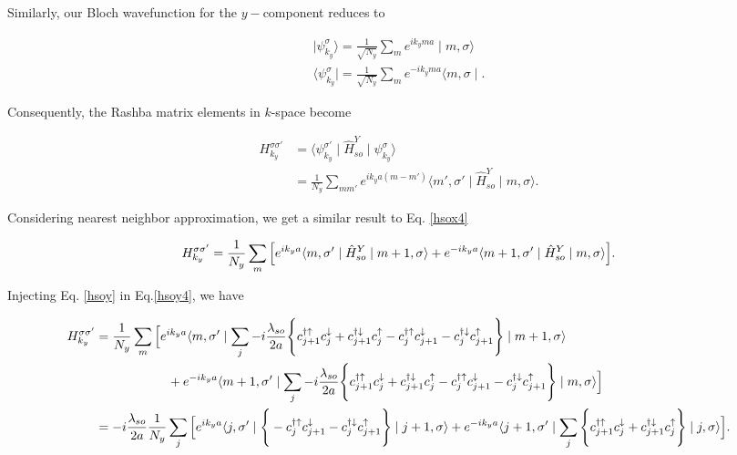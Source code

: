 \documentclass[10pt,prb,showpacs,amssymb,floatfix]{revtex4-1}
\begin{document}
Similarly, our Bloch wavefunction for the $y-$component reduces to

\begin{align}
\mid \psi^\sigma_{k_y} \rangle = \frac{1}{\sqrt{N_y}} \sum_{m} e^{ik_yma} \mid m,\sigma\rangle \\
\langle \psi^\sigma_{k_y} \mid = \frac{1}{\sqrt{N_y}} \sum_{m} e^{-ik_yma} \langle m,\sigma\mid.
\end{align}

Consequently, the Rashba matrix elements in $k$-space become

\begin{align}
H_{k_y}^{\sigma \sigma'} &= \langle \psi^{\sigma'}_{k_y} \mid \hat H^Y_{so} \mid \psi^\sigma_{k_y} \rangle \\
&= \frac{1}{N_y}\sum_{m m'} e^{i k_y a (m-m')} \langle m',\sigma' \mid \hat{H}^Y_{so} \mid m,\sigma\rangle.
\label{hsoy2}
\end{align}

Considering nearest neighbor approximation, we get a similar result to Eq. \eqref{hsox4}

\begin{align}
H_{k_y}^{\sigma \sigma'} = \frac{1}{N_y}\sum_{m} \Big{[} e^{i k_y a} \langle m,\sigma' \mid \hat{H}^Y_{so} \mid m+1,\sigma\rangle + e^{-i k_y a} \langle m+1,\sigma' \mid \hat{H}^Y_{so} \mid m,\sigma\rangle \Big{]}.
\label{hsoy4}
\end{align}


Injecting Eq. \eqref{hsoy} in Eq.\eqref{hsoy4}, we have

\begin{align}
H_{k_y}^{\sigma \sigma'} &= \frac{1}{N_y}\sum_{m} \Big{[} e^{i k_y a} \langle m,\sigma' \mid \sum_{j}  -i\frac{\lambda_{so}}{2a} \Bigg{\{} c_{j+1}^{\dagger \uparrow} c_{j}^\downarrow +  c_{j+1}^{\dagger \downarrow} c_{j}^\uparrow - c_{j}^{\dagger \uparrow} c_{j+1}^\downarrow   - c_{j}^{\dagger \downarrow} c_{j+1}^\uparrow \Bigg{\}} \mid m+1,\sigma\rangle \\
&~~~~~~~~~~~~~~~~~ + e^{-i k_y a} \langle m+1,\sigma' \mid \sum_{j}  -i\frac{\lambda_{so}}{2a} \Bigg{\{} c_{j+1}^{\dagger \uparrow} c_{j}^\downarrow +  c_{j+1}^{\dagger \downarrow} c_{j}^\uparrow - c_{j}^{\dagger \uparrow} c_{j+1}^\downarrow   - c_{j}^{\dagger \downarrow} c_{j+1}^\uparrow \Bigg{\}} \mid m,\sigma\rangle \Big{]} \\
&= -i\frac{\lambda_{so}}{2a} \frac{1}{N_y}\sum_{j} \Big{[} e^{i k_y a} \langle j,\sigma' \mid    \Bigg{\{}  - c_{j}^{\dagger \uparrow} c_{j+1}^\downarrow   - c_{j}^{\dagger \downarrow} c_{j+1}^\uparrow \Bigg{\}} \mid j+1,\sigma\rangle +e^{-i k_y a} \langle j+1,\sigma' \mid \sum_{j} \Bigg{\{} c_{j+1}^{\dagger \uparrow} c_{j}^\downarrow +  c_{j+1}^{\dagger \downarrow} c_{j}^\uparrow  \Bigg{\}} \mid j,\sigma\rangle \Big{]}.
\label{hsoy5}
\end{align}
\end{document}
